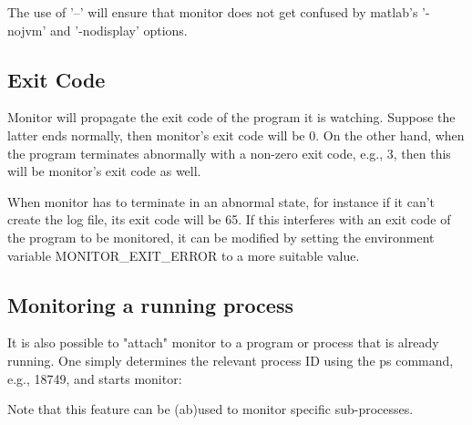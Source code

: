 \begin{prompt}
\end{prompt}

The use of '--' will ensure that monitor does not get confused by matlab's '-nojvm' and '-nodisplay' options.

\subsection{Exit Code}

Monitor will propagate the exit code of the program it is watching. Suppose the
latter ends normally, then monitor's exit code will be 0. On the other hand,
when the program terminates abnormally with a non-zero exit code, e.g., 3, then
this will be monitor's exit code as well.

When monitor has to terminate in an abnormal state, for instance if it can't
create the log file, its exit code will be 65. If this interferes with an exit
code of the program to be monitored, it can be modified by setting the
environment variable MONITOR\_EXIT\_ERROR to a more suitable value.

\subsection{Monitoring a running process}

It is also possible to "attach" monitor to a program or process that is already
running. One simply determines the relevant process ID using the ps command,
e.g., 18749, and starts monitor:

\begin{prompt}
\end{prompt}

Note that this feature can be (ab)used to monitor specific sub-processes.
